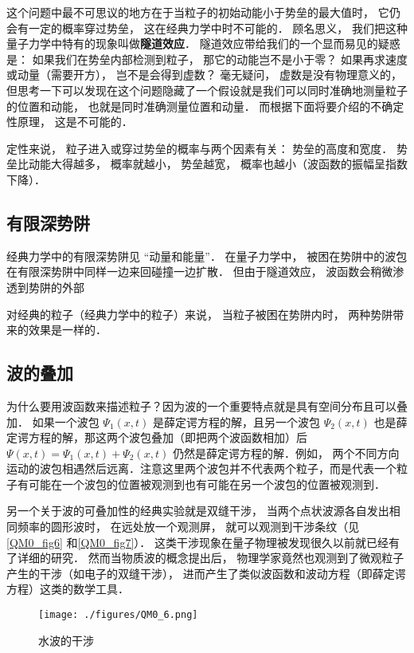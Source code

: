 这个问题中最不可思议的地方在于当粒子的初始动能小于势垒的最大值时， 它仍会有一定的概率穿过势垒， 这在经典力学中时不可能的． 顾名思义， 我们把这种量子力学中特有的现象叫做\textbf{隧道效应}． 隧道效应带给我们的一个显而易见的疑惑是： 如果我们在势垒内部检测到粒子， 那它的动能岂不是小于零？ 如果再求速度或动量（需要开方）， 岂不是会得到虚数？ 毫无疑问， 虚数是没有物理意义的， 但思考一下可以发现在这个问题隐藏了一个假设就是我们可以同时准确地测量粒子的位置和动能， 也就是同时准确测量位置和动量． 而根据下面将要介绍的不确定性原理， 这是不可能的．

定性来说， 粒子进入或穿过势垒的概率与两个因素有关： 势垒的高度和宽度． 势垒比动能大得越多， 概率就越小， 势垒越宽， 概率也越小（波函数的振幅呈指数下降）．

\subsection{有限深势阱}
经典力学中的有限深势阱见 “动量和能量”． 在量子力学中， 被困在势阱中的波包在有限深势阱中同样一边来回碰撞一边扩散． 但由于隧道效应， 波函数会稍微渗透到势阱的外部

对经典的粒子（经典力学中的粒子）来说， 当粒子被困在势阱内时， 两种势阱带来的效果是一样的．


\subsection{波的叠加}
为什么要用波函数来描述粒子？因为波的一个重要特点就是具有空间分布且可以叠加． 如果一个波包 $\Psi_1(x, t)$ 是薛定谔方程的解，且另一个波包 $\Psi_2(x, t)$ 也是薛定谔方程的解，那这两个波包叠加（即把两个波函数相加）后 $\Psi(x, t) = \Psi_1(x, t) + \Psi_2(x, t)$ 仍然是薛定谔方程的解．例如， 两个不同方向运动的波包相遇然后远离．注意这里两个波包并不代表两个粒子，而是代表一个粒子有可能在一个波包的位置被观测到也有可能在另一个波包的位置被观测到．

另一个关于波的可叠加性的经典实验就是双缝干涉， 当两个点状波源各自发出相同频率的圆形波时， 在远处放一个观测屏， 就可以观测到干涉条纹（见\autoref{QM0_fig6} 和\autoref{QM0_fig7}）． 这类干涉现象在量子物理被发现很久以前就已经有了详细的研究． 然而当物质波的概念提出后， 物理学家竟然也观测到了微观粒子产生的干涉（如电子的双缝干涉）， 进而产生了类似波函数和波动方程（即薛定谔方程）这类的数学工具．

\begin{figure}[ht]
\centering
\texttt{[image: ./figures/QM0\_6.png]}
\caption{水波的干涉} \label{QM0_fig6}
\end{figure}

